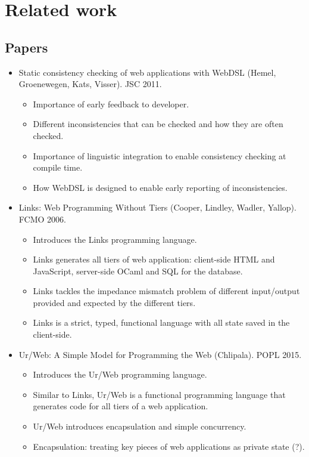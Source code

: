 
\chapter{\label{chap:related-work}Related work}

  \section{Papers}

  \begin{itemize}
    \item Static consistency checking of web applications with WebDSL (Hemel, Groenewegen, Kats, Visser). JSC 2011.
    \begin{itemize}
      \item Importance of early feedback to developer.
      \item Different inconsistencies that can be checked and how they are often checked.
      \item Importance of linguistic integration to enable consistency checking at compile time.
      \item How WebDSL is designed to enable early reporting of inconsistencies.
    \end{itemize}

    \item Links: Web Programming Without Tiers (Cooper, Lindley, Wadler, Yallop). FCMO 2006.
    \begin{itemize}
      \item Introduces the Links programming language.
      \item Links generates all tiers of web application: client-side HTML and JavaScript, server-side OCaml and SQL for the database.
      \item Links tackles the impedance mismatch problem of different input/output provided and expected by the different tiers.
      \item Links is a strict, typed, functional language with all state saved in the client-side.
    \end{itemize}

    \item Ur/Web: A Simple Model for Programming the Web (Chlipala). POPL 2015.
    \begin{itemize}
      \item Introduces the Ur/Web programming language.
      \item Similar to Links, Ur/Web is a functional programming language that generates code for all tiers of a web application.
      \item Ur/Web introduces encapsulation and simple concurrency.
      \item Encapsulation: treating key pieces of web applications as private state (?).
    \end{itemize}
  \end{itemize}

